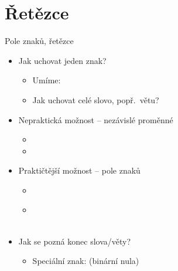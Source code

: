 \section{Řetězce}
\frame{\sectionpage}

\begin{frame}{Pole znaků, řetězce}

  \begin{itemize}
    \item Jak uchovat jeden znak?
    \begin{itemize}
      \item Umíme: 

      \pause

      \item Jak uchovat celé slovo, popř.\ větu?
    \end{itemize}

    \pause

    \item Nepraktická možnost -- nezávislé proměnné
    \begin{itemize}
      \item {}
      \item {}
    \end{itemize}

    \pause

    \item Praktičtější možnost -- pole znaků
    \begin{itemize}
      \item {}
      \item {} \\
        ~~
    \end{itemize}

    \pause

    \item Jak se pozná konec slova/věty?
    \begin{itemize}
      \item Speciální znak:  (binární nula)
    \end{itemize}

  \end{itemize}

\end{frame}

